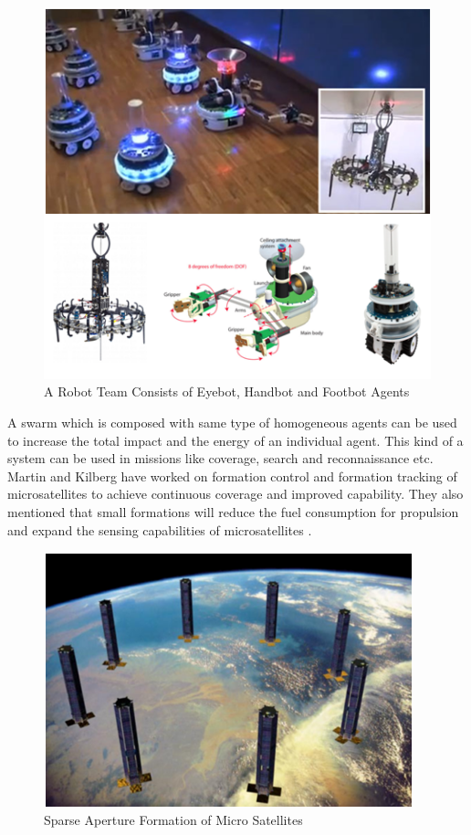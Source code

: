 \begin{figure}[H]
\caption{A Robot Team Consists of Eyebot, Handbot and Footbot Agents \cite{99}}
\centering
\includegraphics[scale = 1]{eyebot}
\end{figure} 
\newpage
A swarm which is composed with same type of homogeneous agents can be used to increase the total impact and the energy of an individual agent. This kind of a system can be used in missions like coverage, search and  reconnaissance etc.  Martin and Kilberg have worked on formation control and formation tracking of  microsatellites to achieve continuous coverage and improved capability. They also mentioned that small formations will reduce the fuel consumption for propulsion and expand the sensing capabilities of microsatellites \cite{15}.

\begin{figure}[H]
\caption{Sparse Aperture Formation of Micro Satellites \cite{15}}
\centering
\includegraphics[scale = 1]{Satellite}
\end{figure} 

